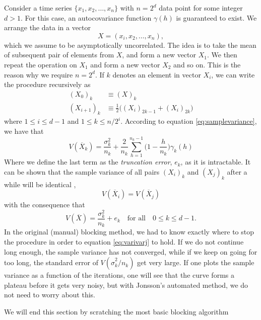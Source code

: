 Consider a time series $\{x_1, x_2, \hdots, x_n\}$ with $n=2^d$ data point for some integer $d>1$. For this case, an autocovariance function $\gamma(h)$ is guaranteed to exist. We arrange the data in a vector
\begin{equation}
X=(x_i,x_2,\hdots,x_n),
\end{equation}
which we assume to be asymptotically uncorrelated. The idea is to take the mean of subsequent pair of elements from $X$, and form a new vector $X_1$. We then repeat the operation on $X_1$ and form a new vector $X_2$ and so on. This is the reason why we require $n=2^d$. If $k$ denotes an element in vector $X_i$, we can write the procedure recursively as
\begin{equation}
\begin{aligned}
(X_0)_k&\equiv(X)_k\\
(X_{i+1})_k&\equiv\frac{1}{2}\Big((X_i)_{2k-1}+(X_i)_{2k}\Big)
\end{aligned}
\end{equation}
where $1\leq i\leq d-1$ and $1\leq k\leq n/2^i$. According to equation \eqref{eq:samplevariance}, we have that
\begin{equation}
V(\overline{X}_k)=\frac{\sigma_k^2}{n_k}+\frac{2}{n_k}\sum_{h=1}^{n_k-1}\Big(1-\frac{h}{n_k}\Big)\gamma_k(h)
\end{equation}
Where we define the last term as the \textit{truncation error}, $e_k$, as it is intractable. It can be shown that the sample variance of all pairs $(X_i)_k$ and $(X_j)_k$ after a while will be identical \cite{flyvbjerg_error_1989},
\begin{equation}
V(\overline{X}_i)=V(\overline{X}_j)
\label{eq:varivarj}
\end{equation}
with the consequence that
\begin{equation}
V(\overline{X})=\frac{\sigma_k^2}{n_k}+e_k\quad\text{for all}\quad 0\leq k\leq d-1.
\end{equation}
In the original (manual) blocking method, we had to know exactly where to stop the procedure in order to equation \eqref{eq:varivarj} to hold. If we do not continue long enough, the sample variance has not converged, while if we keep on going for too long, the standard error of $V(\hat{\sigma}_k^2/n_k)$ get very large. If one plots the sample variance as a function of the iterations, one will see that the curve forms a plateau before it gets very noisy, but with Jonsson's automated method, we do not need to worry about this. 

We will end this section by scratching the most basic blocking algorithm


